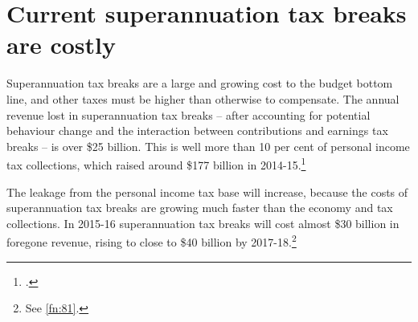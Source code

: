\section{Current superannuation tax breaks are costly}\label{sec:SUPER-2-8}
Superannuation tax breaks are a large and growing cost to the budget bottom line, and other taxes must be higher than otherwise to compensate. The annual revenue lost in superannuation tax breaks – after accounting for potential behaviour change and the interaction between contributions and earnings tax breaks – is over \$25 billion.%
\label{fn:81} 
This is well more than 10 per cent of personal income tax collections, which raised around \$177 billion in 2014-15.\footcite[][4--14]{Treasury2015BudgetPapers201516}

The leakage from the personal income tax base will increase, because the costs of superannuation tax breaks are growing much faster than the economy and tax collections. 
In 2015-16 superannuation tax breaks will cost almost \$30 billion in foregone revenue, rising to close to \$40 billion by 2017-18.\footnote{See \cref{fn:81}.}

